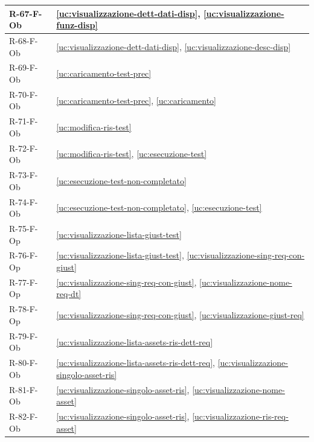 ﻿\documentclass[a4paper,12pt]{article}
\begin{document}
{\begin{longtable}{|
      >{\centering\arraybackslash}p{}|
      >{\centering\arraybackslash}p{}|
      }
            R-67-F-Ob       & \ref{uc:visualizzazione-dett-dati-disp}, \ref{uc:visualizzazione-funz-disp}                 \\ \hline
            R-68-F-Ob       & \ref{uc:visualizzazione-dett-dati-disp}, \ref{uc:visualizzazione-desc-disp}                 \\ \hline
            R-69-F-Ob       & \ref{uc:caricamento-test-prec}                                               \\ \hline
            R-70-F-Ob       & \ref{uc:caricamento-test-prec}, \ref{uc:caricamento}                       \\ \hline
            R-71-F-Ob       & \ref{uc:modifica-ris-test}                                               \\ \hline
            R-72-F-Ob       & \ref{uc:modifica-ris-test}, \ref{uc:esecuzione-test}                       \\ \hline
            R-73-F-Ob       & \ref{uc:esecuzione-test-non-completato}                                               \\ \hline
            R-74-F-Ob       & \ref{uc:esecuzione-test-non-completato}, \ref{uc:esecuzione-test}                       \\ \hline
            R-75-F-Op       & \ref{uc:visualizzazione-lista-giust-test}                                               \\ \hline
            R-76-F-Op       & \ref{uc:visualizzazione-lista-giust-test}, \ref{uc:visualizzazione-sing-req-con-giust}                 \\ \hline
            R-77-F-Op       & \ref{uc:visualizzazione-sing-req-con-giust}, \ref{uc:visualizzazione-nome-req-dt}             \\ \hline
            R-78-F-Op       & \ref{uc:visualizzazione-sing-req-con-giust}, \ref{uc:visualizzazione-giust-req}         \\ \hline
            R-79-F-Ob       & \ref{uc:visualizzazione-lista-assets-ris-dett-req}                                               \\ \hline
            R-80-F-Ob       & \ref{uc:visualizzazione-lista-assets-ris-dett-req}, \ref{uc:visualizzazione-singolo-asset-ris}                 \\ \hline
            R-81-F-Ob       & \ref{uc:visualizzazione-singolo-asset-ris}, \ref{uc:visualizzazione-nome-asset}             \\ \hline
            R-82-F-Ob       & \ref{uc:visualizzazione-singolo-asset-ris}, \ref{uc:visualizzazione-ris-req-asset}         \\ \hline

\end{longtable}}
\end{document}
